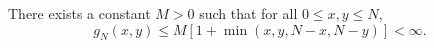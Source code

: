 There exists a constant \(M > 0\) such that for all \(0 \leq x, y \leq N\),
\[
g_N(x,y) \leq M[1 + \min(x, y, N-x, N-y)] < \infty.
\]
